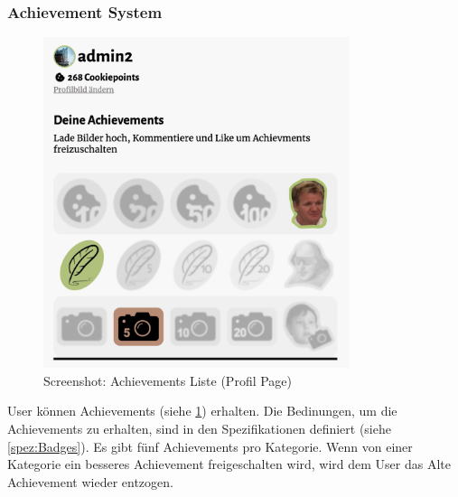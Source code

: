 \subsubsection*{Achievement System}

\begin{figure}[ht]
    \centering
    \includegraphics[width=0.8\textwidth]{images/Resultate_Achievements.png}
    \caption{Screenshot: Achievements Liste (Profil Page)}
    \label{fig:r-Achievement}
\end{figure} 

User können Achievements (siehe \ref{fig:r-Achievement}) erhalten. Die Bedinungen, um die Achievements zu
erhalten, sind in den Spezifikationen definiert (siehe \ref{spez:Badges}). Es
gibt fünf Achievements pro Kategorie. Wenn von einer Kategorie ein besseres
Achievement freigeschalten wird, wird dem User das Alte Achievement wieder
entzogen.

